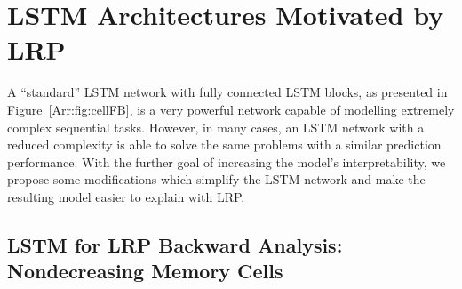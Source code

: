 \documentclass[runningheads]{llncs}
\begin{document}
\section{LSTM Architectures Motivated by LRP}
\label{Arr:sec:Explain_Adjusted_LSTM}
A ``standard'' LSTM network with fully connected LSTM blocks, as presented in Figure~\ref{Arr:fig:cellFB}, is a very powerful network capable of modelling extremely complex sequential tasks. However, in many cases, an LSTM network with a reduced complexity is able to solve the same problems with a similar prediction performance.
With the further goal of increasing the model's interpretability, we propose some modifications which simplify the LSTM network and make the resulting model easier to explain with LRP.
\subsection{LSTM for LRP Backward Analysis: Nondecreasing Memory Cells}
\end{document}
